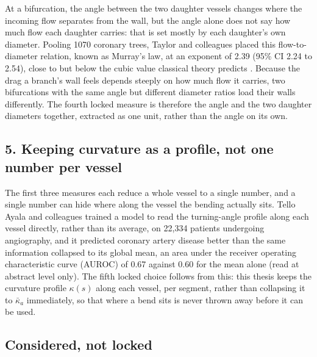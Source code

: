 At a bifurcation, the angle between the two daughter vessels changes where the incoming flow
separates from the wall, but the angle alone does not say how much flow each daughter carries: that
is set mostly by each daughter's own diameter. Pooling 1070 coronary trees, Taylor and colleagues
placed this flow-to-diameter relation, known as Murray's law, at an exponent of 2.39
(95\% CI 2.24 to 2.54), close to but below the cubic value classical theory predicts
\cite{taylor2024murray}. Because the drag a branch's wall feels depends steeply on how much flow it
carries, two bifurcations with the same angle but different diameter ratios load their walls
differently. The fourth locked measure is therefore the angle and the two daughter diameters
together, extracted as one unit, rather than the angle on its own.

\subsection*{5. Keeping curvature as a profile, not one number per vessel}

The first three measures each reduce a whole vessel to a single number, and a single number can hide
where along the vessel the bending actually sits. Tello Ayala and colleagues trained a model to read
the turning-angle profile along each vessel directly, rather than its average, on 22{,}334 patients
undergoing angiography, and it predicted coronary artery disease better than the same information
collapsed to its global mean, an area under the receiver operating characteristic curve (AUROC) of
0.67 against 0.60 for the mean alone \cite{telloayala2026tortuosity} (read at abstract level only).
The fifth locked choice follows from this: this thesis keeps the curvature profile $\kappa(s)$ along
each vessel, per segment, rather than collapsing it to $\bar\kappa_a$ immediately, so that where a
bend sits is never thrown away before it can be used.

\subsection*{Considered, not locked}

